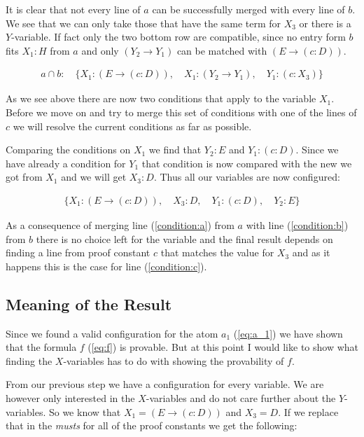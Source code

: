 It is clear that not every line of $a$ can be successfully merged with every line of $b$. We see that we can only take those that have the same term for $X_3$ or there is a $Y$-variable. If fact only the two bottom row are compatible, since no entry form $b$ fits $X_1: H$ from $a$ and only $(Y_2 \rightarrow Y_1)$ can be matched with $(E \rightarrow (c:D))$.

\begin{align}
	a \cap b: \quad \{X_1: (E \rightarrow (c:D)), \quad X_1: (Y_2 \rightarrow Y_1), \quad Y_1: (c:X_3)\}
\end{align}

As we see above there are now two conditions that apply to the variable $X_1$. Before we move on and try to merge this set of conditions with one of the lines of $c$ we will resolve the current conditions as far as possible.

Comparing the conditions on $X_1$ we find that $Y_2: E$ and $Y_1: (c:D)$. Since we have already a condition for $Y_1$ that condition is now compared with the new we got from $X_1$ and we will get $X_3: D$. Thus all our variables are now configured:

\begin{align}
	\{X_1: (E \rightarrow (c:D)), \quad X_3: D, \quad Y_1: (c:D), \quad Y_2: E\}
\end{align}

As a consequence of merging line (\ref{condition:a}) from $a$ with line (\ref{condition:b}) from $b$ there is no choice left for the variable and the final result depends on finding a line from proof constant $c$ that matches the value for $X_3$ and as it happens this is the case for line (\ref{condition:c}).


\subsection{Meaning of the Result}
Since we found a valid configuration for the atom $a_1$ (\ref{eq:a_1}) we have shown that the formula $f$ (\ref{eq:f}) is provable. But at this point I would like to show what finding the $X$-variables has to do with showing the provability of $f$.

From our previous step we have a configuration for every variable. We are however only interested in the $X$-variables and do not care further about the $Y$-variables. So we know that $X_1 = (E \rightarrow (c:D))$ and $X_3 = D$. If we replace that in the \emph{musts} for all of the proof constants we get the following:


